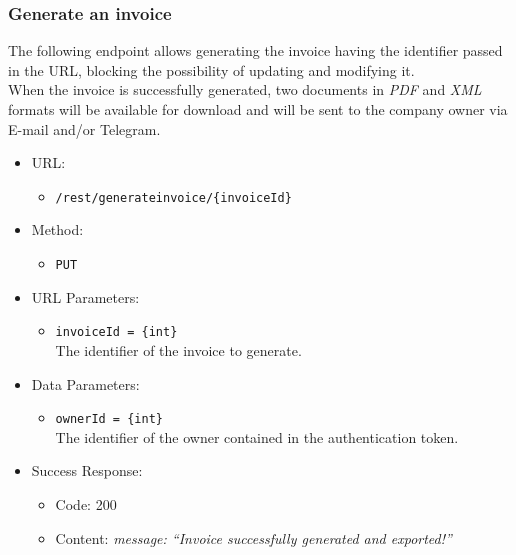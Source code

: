 \newpage
\subsubsection*{Generate an invoice}

The following endpoint allows generating the invoice having the identifier passed in the URL, blocking the possibility of updating and modifying it. \\
When the invoice is successfully generated, two documents in \textit{PDF} and \textit{XML} formats will be available for download and will be sent to the company owner via E-mail and/or Telegram. 

\begin{itemize}
    
    \item URL: 
    \begin{itemize}
        \item \texttt{/rest/generateinvoice/\{invoiceId\}}
    \end{itemize}
    
    \item Method: 
    \begin{itemize}
        \item \texttt{PUT}
    \end{itemize}
    
    \item URL Parameters: 
    \begin{itemize}
        \item \texttt{invoiceId = \{int\}} \\
        The identifier of the invoice to generate.
    \end{itemize}
    
    \item Data Parameters: 
    \begin{itemize}
        \item \texttt{ownerId = \{int\}} \\
        The identifier of the owner contained in the authentication token.
    \end{itemize}
    
    \item Success Response: 
    \begin{itemize}
        \item Code: 200
        \item Content:
        \textit{            
{
    message: “Invoice successfully generated and exported!”
}
        }
    \end{itemize}
    

\end{itemize}
